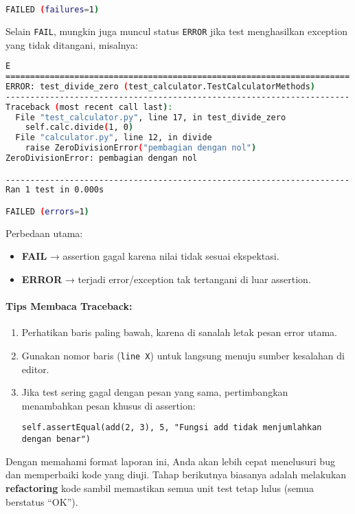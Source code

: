 \begin{lstlisting}[language=bash]
FAILED (failures=1)
\end{lstlisting}

Selain \texttt{FAIL}, mungkin juga muncul status \texttt{ERROR} jika test menghasilkan exception yang tidak ditangani, misalnya:

\begin{lstlisting}[language=bash]
E
======================================================================
ERROR: test_divide_zero (test_calculator.TestCalculatorMethods)
----------------------------------------------------------------------
Traceback (most recent call last):
  File "test_calculator.py", line 17, in test_divide_zero
    self.calc.divide(1, 0)
  File "calculator.py", line 12, in divide
    raise ZeroDivisionError("pembagian dengan nol")
ZeroDivisionError: pembagian dengan nol

----------------------------------------------------------------------
Ran 1 test in 0.000s

FAILED (errors=1)
\end{lstlisting}

Perbedaan utama:
\begin{itemize}
    \item \textbf{FAIL} → assertion gagal karena nilai tidak sesuai ekspektasi.
    \item \textbf{ERROR} → terjadi error/exception tak tertangani di luar assertion.
\end{itemize}

\paragraph{Tips Membaca Traceback:}
\begin{enumerate}
    \item Perhatikan baris paling bawah, karena di sanalah letak pesan error utama.
    \item Gunakan nomor baris (\texttt{line X}) untuk langsung menuju sumber kesalahan di editor.
    \item Jika test sering gagal dengan pesan yang sama, pertimbangkan menambahkan pesan khusus di assertion:
    \begin{lstlisting}[style=PythonStyle]
    self.assertEqual(add(2, 3), 5, "Fungsi add tidak menjumlahkan dengan benar")
    \end{lstlisting}
\end{enumerate}

Dengan memahami format laporan ini, Anda akan lebih cepat menelusuri bug dan memperbaiki kode yang diuji.  
Tahap berikutnya biasanya adalah melakukan \textbf{refactoring} kode sambil memastikan semua unit test tetap lulus (semua berstatus “OK”).


